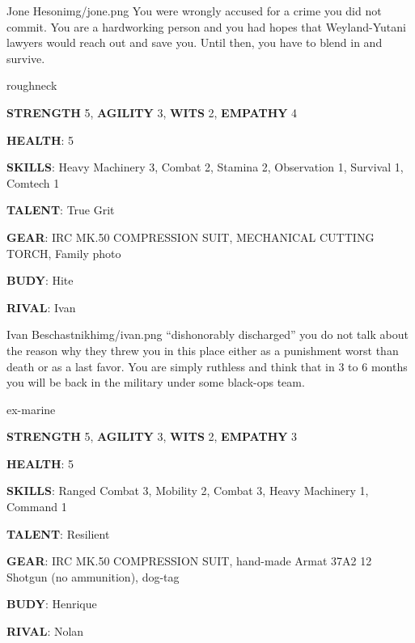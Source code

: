 \newsect

\begin{rpg-pcbox}{Jone Heson}{img/jone.png}
    You were wrongly accused for a crime you did not commit. You are a hardworking person and you had hopes that Weyland-Yutani lawyers would reach out and save you. Until then, you have to blend in and survive.
\end{rpg-pcbox}

\begin{rpg-commentbox}{}
    roughneck

    \textbf{STRENGTH} 5, \textbf{AGILITY} 3, \textbf{WITS} 2, \textbf{EMPATHY} 4

    \textbf{HEALTH}: 5

    \textbf{SKILLS}: Heavy Machinery 3, Combat 2, Stamina 2, Observation 1, Survival 1, Comtech 1
    
    \textbf{TALENT}: True Grit
    
    \textbf{GEAR}: IRC MK.50 COMPRESSION SUIT, MECHANICAL CUTTING TORCH, Family photo

    \textbf{BUDY}: Hite
    
    \textbf{RIVAL}: Ivan
\end{rpg-commentbox}

\newsect


\begin{rpg-pcbox}{Ivan Beschastnikh}{img/ivan.png}
    ``dishonorably discharged'' you do not talk about the reason why they threw you in this place either as a punishment worst than death or as a last favor. You are simply ruthless and think that in 3 to 6 months you will be back in the military under some black-ops team.
\end{rpg-pcbox}

\begin{rpg-commentbox}{}
    ex-marine

    \textbf{STRENGTH} 5, \textbf{AGILITY} 3, \textbf{WITS} 2, \textbf{EMPATHY} 3

    \textbf{HEALTH}: 5

    \textbf{SKILLS}: Ranged Combat 3, Mobility 2, Combat 3, Heavy Machinery 1, Command 1
    
    \textbf{TALENT}: Resilient
    
    \textbf{GEAR}: IRC MK.50 COMPRESSION SUIT, hand-made Armat 37A2 12 Shotgun (no ammunition), dog-tag

    \textbf{BUDY}: Henrique
    
    \textbf{RIVAL}: Nolan
\end{rpg-commentbox}

